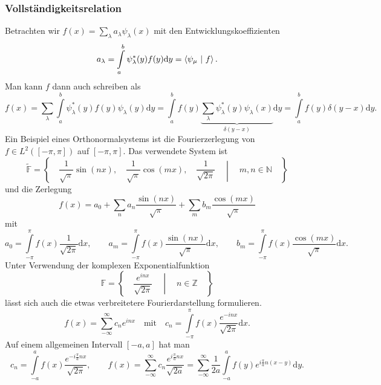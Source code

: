 \documentclass[a4paper,12pt,portrait]{book}
\numberwithin{equation}{section}
\begin{document}
\subsubsection{Vollständigkeitsrelation}
Betrachten wir $f(x)=\sum_\lambda a_\lambda \psi_\lambda (x)$ mit den Entwicklungskoeffizienten
\begin{equation*}
a_\lambda = \int\limits_a^b \psi_\lambda^* (y)f(y)\mathrm{d}y=\left\langle \psi_\mu \ \middle| \ f\right\rangle.
\end{equation*}
Man kann $f$ dann auch schreiben als
\begin{equation*}
f(x)=\sum\limits_\lambda\int\limits_a^b \psi_\lambda^*(y)f(y)\psi_\lambda(y)\mathrm{d}y = \int\limits_a^b f(y) \underbrace{\sum\limits_\lambda\psi_\lambda^*(y)\psi_\lambda(x)}_{\delta(y-x)}\mathrm{d}y = \int\limits_a^b f(y)\delta(y-x)\mathrm{d}y.
\end{equation*}
Ein Beispiel eines Orthonormalsystems ist die Fourierzerlegung von $f\in L^2([-\pi,\pi])$ auf $[-\pi,\pi]$. Das verwendete System ist
\begin{equation*}
\tilde{\mathbb{F}}=\left\lbrace \quad \frac{1}{\sqrt{\pi}}\sin(nx),\quad \frac{1}{\sqrt{\pi}}\cos(mx),\quad\frac{1}{\sqrt{2\pi}}\quad\middle|\quad m,n\in\mathbb{N}\quad\right\rbrace
\end{equation*}
und die Zerlegung
\begin{equation*}
f(x)=a_0 + \sum\limits_n a_n \frac{\sin(nx)}{\sqrt{\pi}} + \sum\limits_m b_m \frac{\cos(mx)}{\sqrt{\pi}}
\end{equation*}
mit
\begin{equation*}
a_0 = \int\limits_{-\pi}^\pi f(x)\frac{1}{\sqrt{2\pi}}\mathrm{d}x, \qquad 
a_m = \int\limits_{-\pi}^\pi f(x) \frac{\sin(nx)}{\sqrt{\pi}}\mathrm{d}x, \qquad 
b_m = \int\limits_{-\pi}^\pi f(x)\frac{\cos(mx)}{\sqrt{\pi}}\mathrm{d}x.
\end{equation*}
Unter Verwendung der komplexen Exponentialfunktion
\begin{equation*}
\mathbb{F}=\left\lbrace\quad \frac{e^{inx}}{\sqrt{2\pi}} \quad \middle| \quad n\in\mathbb{Z}\quad\right\rbrace
\end{equation*}
lässt sich auch die etwas verbreitetere Fourierdarstellung formulieren.
\begin{equation*}
f(x)=\sum\limits_{-\infty}^\infty c_n e^{inx}\quad\text{mit}\quad c_n=\int\limits_{-\pi}^\pi f(x)\frac{e^{-inx}}{\sqrt{2\pi}}\mathrm{d}x.
\end{equation*}
Auf einem allgemeinen Intervall $[-a,a]$ hat man
\begin{equation*}
c_n = \int\limits_{-a}^{a} f(x) \frac{e^{-i\frac{\pi}{a}nx}}{\sqrt{2\pi}},\qquad f(x)=\sum\limits_{-\infty}^\infty c_n \frac{e^{i\frac{\pi}{a}nx}}{\sqrt{2a}} = \sum\limits_{-\infty}^\infty \frac{1}{2a}\int\limits_{-a}^a f(y)e^{i\frac{\pi}{a}n(x-y)}\mathrm{d}y.
\end{equation*}
\end{document}
